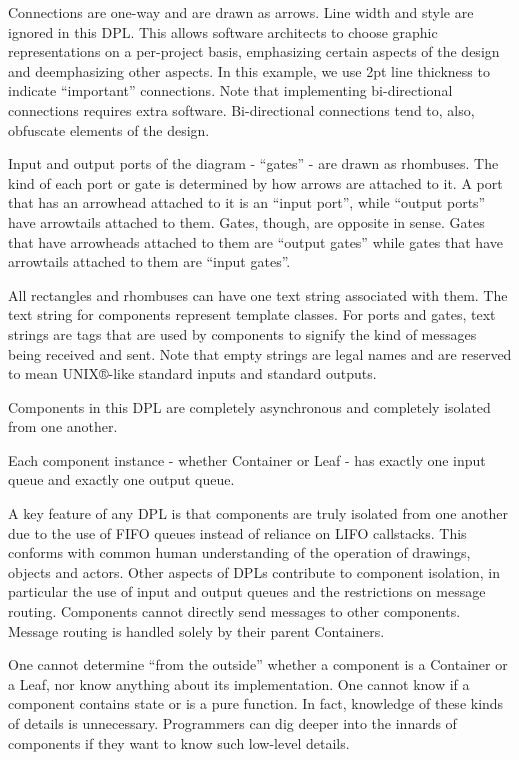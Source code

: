 \documentclass[10pt,anonymous,review]{acmart}
\begin{document}
Connections are one-way and are drawn as arrows. Line width and style are ignored in this DPL. This allows software architects to choose graphic representations on a per-project basis, emphasizing certain aspects of the design and deemphasizing other aspects. In this example, we use 2pt line thickness to indicate “important” connections. Note that implementing bi-directional connections requires extra software. Bi-directional connections tend to,
also, obfuscate elements of the design.

Input and output ports of the diagram - “gates” - are drawn as rhombuses. 
The kind of each port or gate is determined by how arrows are attached to it. A port that has an arrowhead attached to it is an “input port”, while “output ports” have arrowtails attached to them. Gates, though, are opposite in sense. Gates that have arrowheads attached to them are “output gates” while gates that have arrowtails attached to them are “input gates”.

All rectangles and rhombuses can have one text string associated with them. The text string for components represent template classes. For ports and gates, text strings are tags that are used by components to signify the kind of messages being received and sent. Note that empty strings are legal names and are reserved to mean UNIX®-like standard inputs and standard outputs.

Components in this DPL are completely asynchronous and completely isolated from one another. 

Each component instance - whether Container or Leaf - has exactly one input queue and exactly one output queue.

A key feature of any DPL is that components are truly isolated from one another due to the use of FIFO queues instead of reliance on LIFO callstacks. This conforms with common human understanding of the operation of drawings, objects and actors. Other aspects of DPLs contribute to component isolation, in particular the use of input and output queues and the restrictions on message routing. Components cannot directly send messages to other components. Message routing is handled solely by their parent Containers.

One cannot determine “from the outside” whether a component is a Container or a Leaf, nor know anything about its implementation. One cannot know if a component contains state or is a pure function. In fact, knowledge of these kinds of details is unnecessary. Programmers can dig deeper into the innards of components if they want to know such low-level details.
\end{document}
